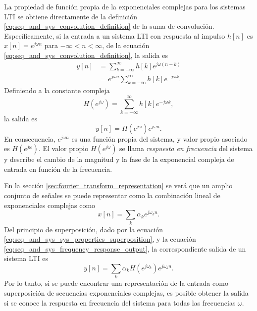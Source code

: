 \documentclass[a4paper]{report}
\begin{document}
La propiedad de función propia de la exponenciales complejas para los sistemas LTI se obtiene directamente de la definición \ref{eq:seq_and_sys_convolution_definition} de la suma de convolución. Específicamente, si la entrada a un sistema LTI con respuesta al impulso \(h[n]\) es \(x[n]=e^{j\omega n}\) para \(-\infty<n<\infty\), de la ecuación \ref{eq:seq_and_sys_convolution_definition}, la salida es
\begin{align*}
 y[n]&=\sum_{k=-\infty}^{\infty}h[k]e^{j\omega(n-k)}\\
   &=e^{j\omega n}\sum_{k=-\infty}^{\infty}h[k]e^{-j\omega k}.
\end{align*}
Definiendo a la constante compleja
\begin{equation}\label{eq:seq_and_sys_frequency_response_definition}
 H(e^{j\omega})=\sum_{k=-\infty}^{\infty}h[k]e^{-j\omega k}, 
\end{equation}
la salida es
\begin{equation}\label{eq:seq_and_sys_frequency_response_output}
 y[n]=H(e^{j\omega})e^{j\omega n}. 
\end{equation}
En consecuencia, \(e^{j\omega n}\) es una función propia del sistema, y valor propio asociado es \(H(e^{j\omega})\). El valor propio \(H(e^{j\omega})\) se llama \emph{respuesta en frecuencia} del sistema y describe el cambio de la magnitud y la fase de la exponencial compleja de entrada en función de la frecuencia.

En la sección \ref{sec:fourier_transform_representation} se verá que un amplio conjunto de señales se puede representar como la combinación lineal de exponenciales complejas como
\begin{equation}\label{eq:seq_and_sys_complex_exponential_linear_combination}
 x[n]=\sum_k\alpha_k e^{j\omega_kn}. 
\end{equation}
Del principio de superposición, dado por la ecuación \ref{eq:seq_and_sys_sys_properties_superposition}, y la ecuación \ref{eq:seq_and_sys_frequency_response_output}, la correspondiente salida de un sistema LTI es
\[
 y[n]=\sum_k\alpha_kH(e^{j\omega_k})e^{j\omega_kn}.
\]
Por lo tanto, si se puede encontrar una representación de la entrada como superposición de secuencias exponenciales complejas, es posible obtener la salida si se conoce la respuesta en frecuencia del sistema para todas las frecuencias \(\omega\).
\end{document}

